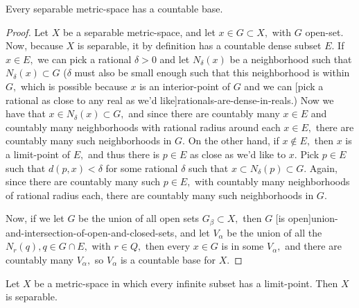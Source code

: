 \documentclass{article}
\begin{document}
\begin{theorem}\label{every-separable-metric-space-has-a-countable-base}
Every \@{separable} \@{metric-space} has a \@{countable} \@{base}.
\end{theorem}

\begin{proof}
Let $X$ be a \@{separable} \@{metric-space}, and let $x \in G \subset X,$ with $G$ \@{open-set}. Now, because $X$ is separable, it by definition has a \@{countable} \@{dense} subset $E.$ If $x \in E,$ we can pick a rational $\delta > 0$ and let $N_{\delta}(x)$ be a \@{neighborhood} such that $N_{\delta}(x) \subset G$ ($\delta$ must also be small enough such that this neighborhood is within $G,$ which is possible because $x$ is an \@{interior-point} of $G$ and we can \@[pick a rational as close to any real as we'd like]{rationals-are-dense-in-reals}.) Now we have that $x \in N_{\delta}(x) \subset G,$ and since there are countably many $x \in E$ and countably many neighborhoods with rational radius around each $x \in E,$ there are countably many such neighborhoods in $G.$ On the other hand, if $x \notin E,$ then $x$ is a \@{limit-point} of $E,$ and thus there is $p \in E$ as close as we'd like to $x.$ Pick $p \in E$ such that $d(p,x) < \delta$ for some rational $\delta$ such that $x \subset N_{\delta}(p) \subset G.$ Again, since there are countably many such $p \in E,$ with countably many neighborhoods of rational radius each, there are countably many such neighborhoods in $G.$

Now, if we let $G$ be the union of all open sets $G_\beta \subset X,$ then $G$ \@[is open]{union-and-intersection-of-open-and-closed-sets}, and let ${V_\alpha}$ be the union of all the $N_r(q), q \in G \cap E,$ with $r \in Q,$ then every $x \in G$ is in some ${V_\alpha},$ and there are countably many ${V_\alpha},$ so ${V_\alpha}$ is a countable \@{base} for $X.$
\end{proof}

\begin{theorem}\label{every-metric-space-where-every-infinite-subset-has-a-limit-point-is-separable}
Let $X$ be a \@{metric-space} in which every \@{infinite} subset has a \@{limit-point}. Then $X$ is \@{separable}.
\end{theorem}
\end{document}
